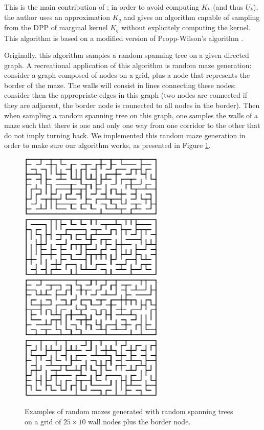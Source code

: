 \documentclass{article}
\begin{document}
This is the main contribution of \cite{tremblay2017} ; in order to avoid computing $K_k$ (and thus $U_k$), the author uses an approximation $K_q$ and gives an algorithm capable of sampling from the DPP of marginal kernel $K_q$ without explicitely computing the kernel. This algorithm is based on a modified version of Propp-Wilson's algorithm \cite{propp1998}. 


Originally, this algorithm samples a random spanning tree on a given directed graph. A recreational application of this algorithm is random maze generation: consider a graph composed of nodes on a grid, plus a node that represents the border of the maze. The walls will consist in lines connecting these nodes: consider then the appropriate edges in this graph (two nodes are connected if they are adjacent, the border node is connected to all nodes in the border). Then when sampling a random spanning tree on this graph, one samples the walls of a maze such that there is one and only one way from one corridor to the other that do not imply turning back. We implemented this random maze generation in order to make sure our algorithm works, as presented in Figure \ref{fig:randommazes}.


\begin{figure}[ht]
\centering
\includegraphics[height=3cm, trim=2cm 2.5cm 2cm 2.5cm, clip]{maze1.eps}
\includegraphics[height=3cm, trim=2cm 2.5cm 2cm 2.5cm, clip]{maze2.eps}
\includegraphics[height=3cm, trim=2cm 2.5cm 2cm 2.5cm, clip]{maze3.eps}
\includegraphics[height=3cm, trim=2cm 2.5cm 2cm 2.5cm, clip]{maze4.eps}
\caption{Examples of random mazes generated with random spanning trees on a grid of $25\times10$ wall nodes plus the border node.}\label{fig:randommazes}
\end{figure}
\end{document}
